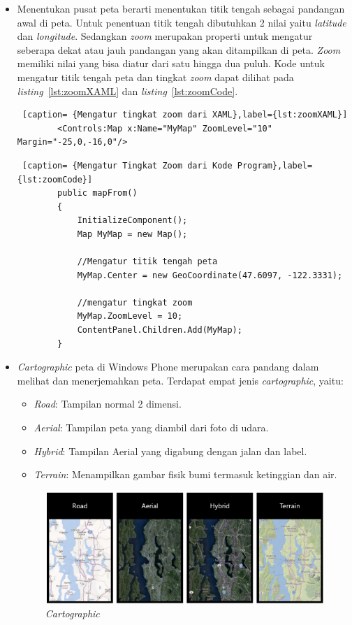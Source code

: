 \begin{itemize}
	\item Menentukan pusat peta berarti menentukan titik tengah sebagai pandangan awal di peta. Untuk penentuan titik tengah dibutuhkan 2 nilai yaitu \textit{latitude} dan \textit{longitude}. Sedangkan \textit{zoom} merupakan properti untuk mengatur seberapa dekat atau jauh pandangan yang akan ditampilkan di peta. \textit{Zoom} memiliki nilai yang bisa diatur dari satu hingga dua puluh. Kode untuk mengatur titik tengah peta dan tingkat \textit{zoom} dapat dilihat pada \textit{listing}~\ref{lst:zoomXAML} dan \textit{listing}~\ref{lst:zoomCode}.\\
	
	\begin{lstlisting} [caption= {Mengatur tingkat zoom dari XAML},label={lst:zoomXAML}]
		<Controls:Map x:Name="MyMap" ZoomLevel="10" Margin="-25,0,-16,0"/>
	\end{lstlisting}

	\begin{lstlisting} [caption= {Mengatur Tingkat Zoom dari Kode Program},label={lst:zoomCode}]
		public mapFrom()
		{
			InitializeComponent();
			Map MyMap = new Map();

			//Mengatur titik tengah peta
			MyMap.Center = new GeoCoordinate(47.6097, -122.3331);

			//mengatur tingkat zoom
			MyMap.ZoomLevel = 10;
			ContentPanel.Children.Add(MyMap);
		}
	\end{lstlisting}

	
	\item \textit{Cartographic} peta di Windows Phone merupakan cara pandang dalam melihat dan menerjemahkan peta. Terdapat empat jenis \textit{cartographic}, yaitu:
		
		\begin{itemize}
			\item \textit{Road}: Tampilan normal 2 dimensi.
			\item \textit{Aerial}: Tampilan peta yang diambil dari foto di udara.
			\item \textit{Hybrid}: Tampilan Aerial yang digabung dengan jalan dan label.
			\item \textit{Terrain}: Menampilkan gambar fisik bumi termasuk ketinggian dan air.
		\end{itemize}
		
		\begin{figure}[h]
			\centering
				\includegraphics[scale=0.4]{Gambar/kartografi}
			\caption{\textit{Cartographic}}
			\label{fig:cartographic}
		\end{figure}
		

\end{itemize}
